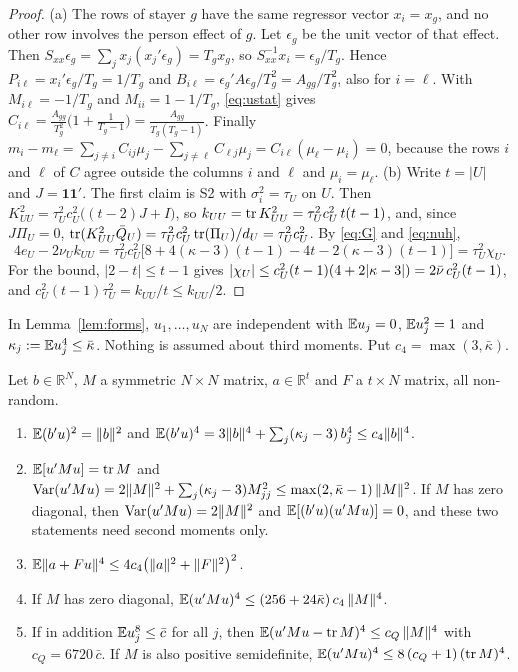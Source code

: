 \begin{proof}
(a) The rows of stayer $g$ have the same regressor vector $x_i=x_g$, and no other row involves the person effect
of $g$. Let $\epsilon_g$ be the unit vector of that effect. Then
$S_{xx}\epsilon_g=\sum_jx_j(x_j'\epsilon_g)=T_gx_g$, so $S_{xx}^{-1}x_i=\epsilon_g/T_g$. Hence
$P_{i\ell}=x_i'\epsilon_g/T_g=1/T_g$ and $B_{i\ell}=\epsilon_g'A\epsilon_g/T_g^2=A_{gg}/T_g^2$, also for $i=\ell$.
With $M_{i\ell}=-1/T_g$ and $M_{ii}=1-1/T_g$, \eqref{eq:ustat} gives
$C_{i\ell}=\frac{A_{gg}}{T_g^2}\big(1+\frac{1}{T_g-1}\big)=\frac{A_{gg}}{T_g(T_g-1)}$. Finally
$m_i-m_\ell=\sum_{j\ne i}C_{ij}\mu_j-\sum_{j\ne\ell}C_{\ell j}\mu_j=C_{i\ell}(\mu_\ell-\mu_i)=0$, because the rows
$i$ and $\ell$ of $C$ agree outside the columns $i$ and $\ell$ and $\mu_i=\mu_\ell$.
(b) Write $t=|U|$ and $J=\mathbf{1}\mathbf{1}'$. The first claim is S2 with $\sigma_i^2=\tau_U$ on $U$. Then
$K_{UU}^2=\tau_U^2c_U^2\big((t-2)J+I\big)$, so $k_{UU}=\operatorname{tr} K_{UU}^2=\tau_U^2c_U^2\,t(t-1)$, and, since $J\Pi_U=0$,
$\operatorname{tr}(K_{UU}^2\bar Q_U)=\tau_U^2c_U^2\operatorname{tr}(\Pi_U)/d_U=\tau_U^2c_U^2$. By \eqref{eq:G} and \eqref{eq:nuh},
\[
4e_U-2\nu_Uk_{UU}=\tau_U^2c_U^2\Big[8+4(\kappa-3)(t-1)-4t-2(\kappa-3)(t-1)\Big]=\tau_U^2\chi_U .
\]
For the bound, $|2-t|\le t-1$ gives $|\chi_U|\le c_U^2(t-1)(4+2|\kappa-3|)=2\bar\nu\,c_U^2(t-1)$, and
$c_U^2(t-1)\tau_U^2=k_{UU}/t\le k_{UU}/2$.
\end{proof}

In Lemma~\ref{lem:forms}, $u_1,\dots,u_N$ are independent with $\mathbb{E} u_j=0$, $\mathbb{E} u_j^2=1$ and
$\kappa_j:=\mathbb{E} u_j^4\le\bar\kappa$. Nothing is assumed about third moments. Put
$c_4=\max(3,\bar\kappa)$.

\begin{lemma}\label{lem:forms}
Let $b\in\mathbb{R}^N$, $M$ a symmetric $N\times N$ matrix, $a\in\mathbb{R}^t$ and $F$ a $t\times N$
matrix, all non-random.
\begin{enumerate}[label=\textup{(\alph*)}]
\item $\mathbb{E}(b'u)^2=\|b\|^2$ and $\mathbb{E}(b'u)^4=3\|b\|^4+\sum_j(\kappa_j-3)\,b_j^4\le c_4\|b\|^4$.
\item $\mathbb{E}[u'Mu]=\operatorname{tr} M$ and $\operatorname{Var}(u'Mu)=2\|M\|^2+\sum_j(\kappa_j-3)M_{jj}^2\le\max(2,\bar\kappa-1)\,\|M\|^2$.
If $M$ has zero diagonal, then $\operatorname{Var}(u'Mu)=2\|M\|^2$ and $\mathbb{E}[(b'u)(u'Mu)]=0$, and these two
statements need second moments only.
\item $\mathbb{E}\|a+Fu\|^4\le4c_4\big(\|a\|^2+\|F\|^2\big)^2$.
\item If $M$ has zero diagonal, $\mathbb{E}(u'Mu)^4\le(256+24\bar\kappa)\,c_4\,\|M\|^4$.
\item If in addition $\mathbb{E} u_j^8\le\bar c$ for all $j$, then $\mathbb{E}(u'Mu-\operatorname{tr} M)^4\le c_Q\,\|M\|^4$ with
$c_Q=6720\,\bar c$. If $M$ is also positive semidefinite, $\mathbb{E}(u'Mu)^4\le8\,(c_Q+1)\,(\operatorname{tr} M)^4$.
\end{enumerate}
\end{lemma}

